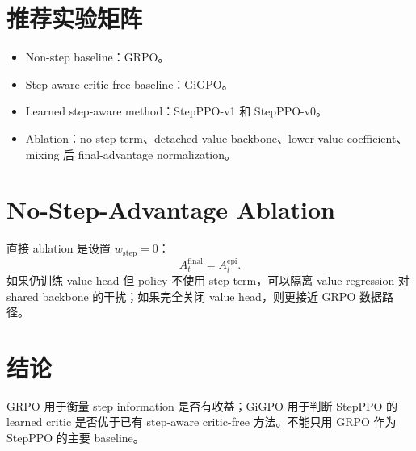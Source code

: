 \documentclass[10pt]{ctexart}
\begin{document}
\section*{推荐实验矩阵}
\begin{itemize}
\item Non-step baseline：GRPO。
\item Step-aware critic-free baseline：GiGPO。
\item Learned step-aware method：StepPPO-v1 和 StepPPO-v0。
\item Ablation：no step term、detached value backbone、lower value coefficient、mixing 后 final-advantage normalization。
\end{itemize}

\section*{No-Step-Advantage Ablation}
直接 ablation 是设置 $w_{\mathrm{step}}=0$：
\[
A_t^{\mathrm{final}}=A_t^{\mathrm{epi}}.
\]
如果仍训练 value head 但 policy 不使用 step term，可以隔离 value regression 对 shared backbone 的干扰；如果完全关闭 value head，则更接近 GRPO 数据路径。

\section*{结论}
GRPO 用于衡量 step information 是否有收益；GiGPO 用于判断 StepPPO 的 learned critic 是否优于已有 step-aware critic-free 方法。不能只用 GRPO 作为 StepPPO 的主要 baseline。
\end{document}
